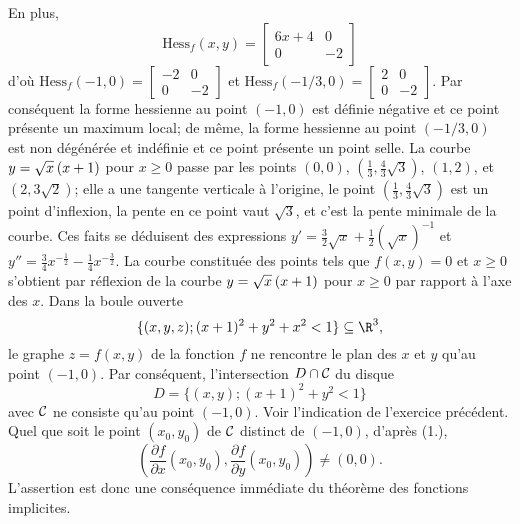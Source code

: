 {\begin{enumerate}
{En plus,
\[
\mathrm{Hess}_f(x,y)=\left[\begin{matrix} 
6x+4 & 0\\  0 & -2
\end{matrix}\right]
\] 
d'o\`u
$\mathrm{Hess}_f(-1,0)= \left[\begin{matrix} 
-2 &  0\\  0 & -2
\end{matrix}\right]$
et
$\mathrm{Hess}_f(-1/3,0)= \left[\begin{matrix} 
2 &  0\\  0 & -2
\end{matrix}\right]$.
Par cons\'equent la forme hessienne au point $(-1,0)$
est d\'efinie n\'egative et ce point pr\'esente  un maximum local;
de m\^eme, la forme hessienne au point $(-1/3,0)$
est non d\'eg\'en\'er\'ee  et ind\'efinie 
et ce point pr\'esente  un point selle.
La courbe $y= \sqrt{x} \hskip 2pt (x+1)$ pour $x\geq 0$
passe par les points $(0,0)$, $(\tfrac 13,\tfrac 43 \sqrt 3)$, 
$(1,2)$, et $(2,3 \sqrt 2)$;
elle a une tangente verticale \`a l'origine,
le point $(\tfrac 13,\tfrac 43 \sqrt 3)$
est un point d'inflexion, la pente en ce point vaut $\sqrt 3$,
et c'est la pente minimale de la courbe.
Ces faits se d\'eduisent
des expressions
$y'= \tfrac 32 \sqrt x + \tfrac 12 (\sqrt x)^{-1}$ et
$y''= \tfrac 34 x^{-\tfrac 12} - \tfrac 14 x^{-\tfrac 32}$.
La courbe constitu\'ee des points tels que $f(x,y)=0$ et $x \geq 0$
s'obtient par r\'eflexion de la courbe
$y= \sqrt{x} \hskip 2pt (x+1)$ pour $x\geq 0$
par rapport \`a l'axe des $x$.
Dans la boule ouverte 
\[
\{(x,y,z);(x+1)^2+y^2+x^2 <1\} \subseteq \R^3, 
\]
le graphe
$z=f(x,y)$ de la fonction $f$ ne rencontre le plan des $x$ et $y$ qu'au point
$(-1,0)$. Par cons\'equent, l'intersection 
$D \cap \cal C$ du disque
\[
D=\{(x,y); (x+1)^2+y^2<1\}
\]
avec $\cal C$ ne consiste qu'au point $(-1,0)$.
Voir l'indication de l'exercice pr\'ec\'edent.
Quel que soit le point 
$(x_0,y_0)$ de ${\cal C}$
distinct de  $(-1,0)$,
d'apr\`es (1.),
\[
\left(\frac{\partial f}{\partial x}(x_0,y_0),\frac{\partial f}{\partial y}(x_0,y_0) \right) 
\ne (0,0).
\] 
L'assertion est donc une cons\'equence imm\'ediate du th\'eor\`eme des 
fonctions implicites.
}
\end{enumerate}
}
